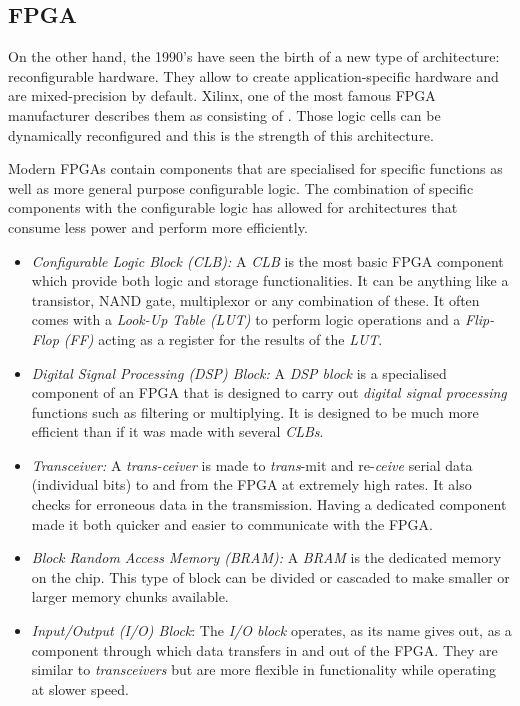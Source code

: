 
\subsection{FPGA}

On the other hand, the 1990's have seen the birth of a new type of architecture: reconfigurable hardware. They allow to create application-specific hardware and are mixed-precision by default. Xilinx, one of the most famous FPGA manufacturer describes them as consisting of  \cite{Xilinx2017}. Those logic cells can be dynamically reconfigured and this is the strength of this architecture.

Modern FPGAs contain components that are specialised for specific functions as well as more general purpose configurable logic. The combination of specific components with the configurable logic has allowed for architectures that consume less power and perform more efficiently.
\begin{itemize}
  \item \emph{Configurable Logic Block (CLB):} A \emph{CLB} is the most basic FPGA component which provide both logic and storage functionalities. It can be anything like a transistor, NAND gate, multiplexor or any combination of these. It often comes with a \emph{Look-Up Table (LUT)} to perform logic operations and a \emph{Flip-Flop (FF)} acting as a register for the results of the \emph{LUT}.
  \item \emph{Digital Signal Processing (DSP) Block:} A \emph{DSP block} is a specialised component of an FPGA that is designed to carry out \emph{digital signal processing} functions such as filtering or multiplying. It is designed to be much more efficient than if it was made with several \emph{CLBs}.
  \item \emph{Transceiver:} A \emph{trans-ceiver} is made to \emph{trans}-mit and re-\emph{ceive} serial data (individual bits) to and from the FPGA at extremely high rates. It also checks for erroneous data in the transmission. Having a dedicated component made it both quicker and easier to communicate with the FPGA.
  \item \emph{Block Random Access Memory (BRAM):} A \emph{BRAM} is the dedicated memory on the chip. This type of block can be divided or cascaded to make smaller or larger memory chunks available.
  \item \emph{Input/Output (I/O) Block}: The \emph{I/O block} operates, as its name gives out, as a component through which data transfers in and out of the FPGA. They are similar to \emph{transceivers} but are more flexible in functionality while operating at slower speed.
\end{itemize}

